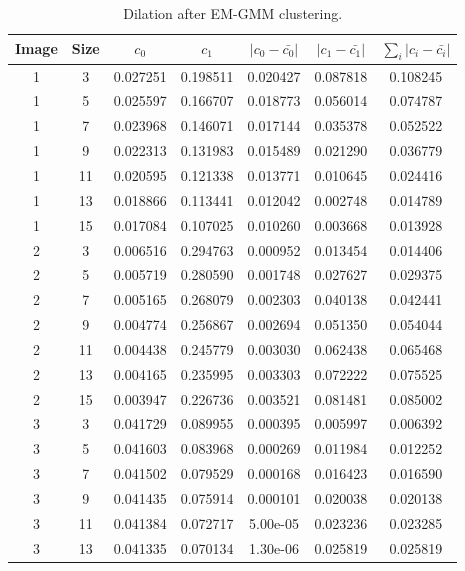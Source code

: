 \begin{longtable}{|c|c|c|c|c|c|c|}
	\caption{Dilation after EM-GMM clustering.} \label{tab:dilateemgmm}\\
	\hline
	Image & Size & $c_0$ & $c_1$ & $|c_0-\bar{c_0}|$ & $|c_1-\bar{c_1}|$ & $\sum_i |c_i-\bar{c_i}|$ \\ 
	\hline 1 &	3 &	0.027251 &	0.198511 &	0.020427 &	0.087818 &	0.108245 \\
	\hline 1 &	5 &	0.025597 &	0.166707 &	0.018773 &	0.056014 &	0.074787 \\
	\hline 1 &	7 &	0.023968 &	0.146071 &	0.017144 &	0.035378 &	0.052522 \\
	\hline 1 &	9 &	0.022313 &	0.131983 &	0.015489 &	0.021290 &	0.036779 \\
	\hline 1 &	11 &	0.020595 &	0.121338 &	0.013771 &	0.010645 &	0.024416 \\
	\hline 1 &	13 &	0.018866 &	0.113441 &	0.012042 &	0.002748 &	0.014789 \\
	\hline \rowcolor{closest} 1 &	15 &	0.017084 &	0.107025 &	0.010260 &	0.003668 &	0.013928 \\
	\hline \rowcolor{closest} 2 &	3 &	0.006516 &	0.294763 &	0.000952 &	0.013454 &	0.014406 \\
	\hline 2 &	5 &	0.005719 &	0.280590 &	0.001748 &	0.027627 &	0.029375 \\
	\hline 2 &	7 &	0.005165 &	0.268079 &	0.002303 &	0.040138 &	0.042441 \\
	\hline 2 &	9 &	0.004774 &	0.256867 &	0.002694 &	0.051350 &	0.054044 \\
	\hline 2 &	11 &	0.004438 &	0.245779 &	0.003030 &	0.062438 &	0.065468 \\
	\hline 2 &	13 &	0.004165 &	0.235995 &	0.003303 &	0.072222 &	0.075525 \\
	\hline 2 &	15 &	0.003947 &	0.226736 &	0.003521 &	0.081481 &	0.085002 \\
	\hline \rowcolor{closest} 3 &	3 &	0.041729 &	0.089955 &	0.000395 &	0.005997 &	0.006392 \\
	\hline 3 &	5 &	0.041603 &	0.083968 &	0.000269 &	0.011984 &	0.012252 \\
	\hline 3 &	7 &	0.041502 &	0.079529 &	0.000168 &	0.016423 &	0.016590 \\
	\hline 3 &	9 &	0.041435 &	0.075914 &	0.000101 &	0.020038 &	0.020138 \\
	\hline 3 &	11 &	0.041384 &	0.072717 &	5.00e-05 &	0.023236 &	0.023285 \\
	\hline 3 &	13 &	0.041335 &	0.070134 &	1.30e-06 &	0.025819 &	0.025819 \\

\end{longtable}
